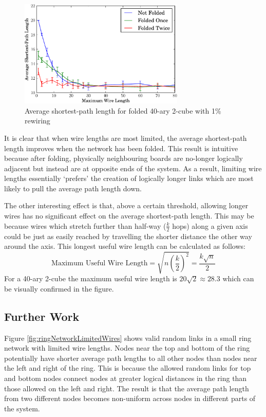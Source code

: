 			\begin{figure}
				\center
				\includegraphics[width=0.7\textwidth]{figures/smallWorldLimitedWiring}
				\caption{Average shortest-path length for folded 40-ary 2-cube with 1\% rewiring}
				\label{fig:smallWorldLimitedWiring}
			\end{figure}
			
			It is clear that when wire lengths are most limited, the average
			shortest-path length improves when the network has been folded. This
			result is intuitive because after folding, physically neighbouring boards
			are no-longer logically adjacent but instead are at opposite ends of the
			system. As a result, limiting wire lengths essentially `prefers' the
			creation of logically longer links which are most likely to pull the
			average path length down.
			
			The other interesting effect is that, above a certain threshold, allowing
			longer wires has no significant effect on the average shortest-path
			length. This may be because wires which stretch further than half-way
			($\frac{k}{2}$ hops) along a given axis could be just as easily reached by
			travelling the shorter distance the other way around the axis. This
			longest useful wire length can be calculated as follows:
			\[
				\textrm{Maximum Useful Wire Length}
					= \sqrt{n \left({\frac{k}{2}}\right)^2}
					= \frac{k\sqrt{n}}{2}
			\]
			For a 40-ary 2-cube the maximum useful wire length is $20\sqrt{2} \approx
			28.3$ which can be visually confirmed in the figure.
		
		\subsection{Further Work}
			
			Figure \ref{fig:ringNetworkLimitedWires} shows valid random links in a
			small ring network with limited wire lengths. Nodes near the top and
			bottom of the ring potentially have shorter average path lengths to all
			other nodes than nodes near the left and right of the ring. This is
			because the allowed random links for top and bottom nodes connect nodes at
			greater logical distances in the ring than those allowed on the left and
			right. The result is that the average path length from two different nodes
			becomes non-uniform across nodes in different parts of the system.
			
